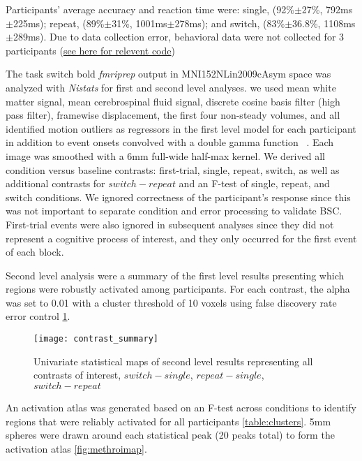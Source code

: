 \documentclass[10pt,letterpaper]{article}
\begin{document}
Participants' average accuracy and reaction time were:
single, (92\%$\pm$27\%, 792ms$\pm$225ms); repeat, (89\%$\pm$31\%, 1001ms$\pm$278ms);
and switch, (83\%$\pm$36.8\%, 1108ms$\pm$289ms).
Due to data collection error, behavioral data were not collected for 3 participants
(\href{https://github.com/jdkent/BetaSeriesRealDataAnalysis/blob/90fafb5b83b2e1bfade61a9fb1a87f225efaa95f/summarizeBehavior/summarize_behavior.ipynb}{see here for relevent code})

The task switch bold \emph{fmriprep} output in MNI152NLin2009cAsym space
was analyzed with \emph{Nistats} for first and second level analyses.
we used mean white matter signal, mean cerebrospinal fluid signal,
discrete cosine basis filter (high pass filter), framewise displacement, the first four non-steady volumes, and
all identified motion outliers as regressors in the first level model for each participant
in addition to event onsets convolved with a double gamma function ~\cite{Glover1999}.
Each image was smoothed with a 6mm full-wide half-max kernel.
We derived all condition versus baseline contrasts: first-trial, single, repeat, switch, as well as
additional contrasts for $switch - repeat$ and an F-test of single, repeat, and switch conditions.
We ignored correctness of the participant's response since this was not important to
separate condition and error processing to validate BSC.
First-trial events were also ignored in subsequent analyses since they did not represent
a cognitive process of interest, and they only occurred for the first event of
each block.

Second level analysis were a summary of the first level results presenting which
regions were robustly activated among participants.
For each contrast, the alpha was set to 0.01 with a cluster threshold of 10 voxels using
false discovery rate error control \ref{fig:stat_maps}.

\begin{figure}[H]
  \centering
  \texttt{[image: contrast\_summary]}
  \caption{
    Univariate statistical maps of second level results representing
    all contrasts of interest, $switch - single$, $repeat - single$, $switch - repeat$}
  \label{fig:stat_maps}
\end{figure}

An activation atlas was generated based on an F-test across conditions
to identify regions that were reliably activated for all participants \ref{table:clusters}.
5mm spheres were drawn around each statistical peak (20 peaks total)
to form the activation atlas \ref{fig:methroimap}.
\end{document}
